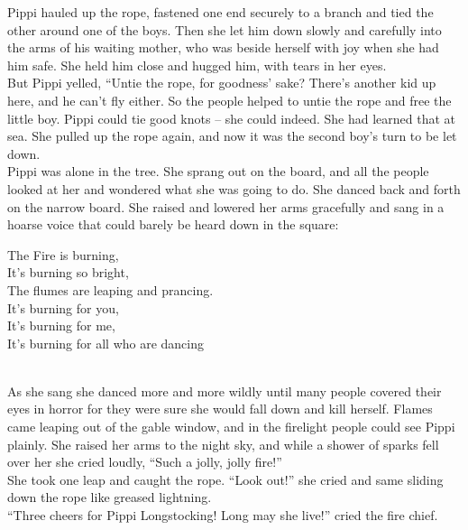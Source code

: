 \documentclass{standard}
\begin{document}
Pippi hauled up the rope, fastened one end securely to a branch and tied the other around one of the boys. Then she let him down slowly and carefully into the arms of his waiting mother, who was beside herself with joy when she had him safe. She held him close and hugged him, with tears in her eyes.\\

But Pippi yelled, “Untie the rope, for goodness’ sake? There’s another kid up here, and he can’t fly either. So the people helped to untie the rope and free the little boy. Pippi could tie good knots -- she could indeed. She had learned that at sea. She pulled up the rope again, and now it was the second boy’s turn to be let down.\\

Pippi was alone in the tree. She sprang out on the board, and all the people looked at her and wondered what she was going to do. She danced back and forth on the narrow board. She raised and lowered her arms gracefully and sang in a hoarse voice that could barely be heard down in the square:\\

\begin{center}
The Fire is burning,\\
It’s burning so bright,\\
The flumes are leaping and prancing.\\
It’s burning for you,\\
It’s burning for me,\\
It’s burning for all who are dancing\\
\end{center}
\noindent \\

As she sang she danced more and more wildly until many people covered their eyes in horror for they were sure she would fall down and kill herself. Flames came leaping out of the gable window, and in the firelight people could see Pippi plainly. She raised her arms to the night sky, and while a shower of sparks fell over her she cried loudly, “Such a jolly, jolly fire!”\\

She took one leap and caught the rope. “Look out!” she cried and same sliding down the rope like greased lightning.\\

“Three cheers for Pippi Longstocking! Long may she live!” cried the fire chief.\\
\end{document}
